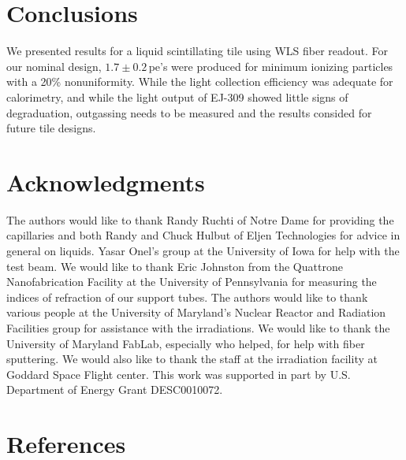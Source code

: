 \documentclass[review]{elsarticle}
\begin{document}
\section{Conclusions}

We presented results for a liquid scintillating tile using WLS fiber readout. For our nominal design, $1.7\pm 0.2$\,pe's
were produced for minimum ionizing particles with a 20\% nonuniformity.
While the light collection efficiency was adequate for calorimetry, and while the light output of EJ-309 showed little signs of degraduation, outgassing needs to be measured and the results consided for future tile designs.

\section{Acknowledgments}
The authors would like to thank Randy Ruchti of Notre Dame for
providing the capillaries and both Randy and Chuck Hulbut of Eljen
Technologies for
advice in general on liquids.
Yasar Onel's group at the University of
Iowa for help with the test beam. We would like to thank Eric
Johnston from the Quattrone Nanofabrication Facility at the University
of Pennsylvania for measuring the indices of refraction of our support
tubes. 
The authors would like to thank {\color{red} various people} at
the University of Maryland's Nuclear Reactor and Radiation
Facilities group for assistance
with the irradiations.
 We would like to thank the University of Maryland
FabLab, especially {\color{red} who helped}, for help with fiber sputtering.
We would also like to thank the staff at the irradiation facility at Goddard Space Flight center.
This work was supported in part by U.S. Department of Energy
Grant DESC0010072.

\section*{References}


\end{document}
